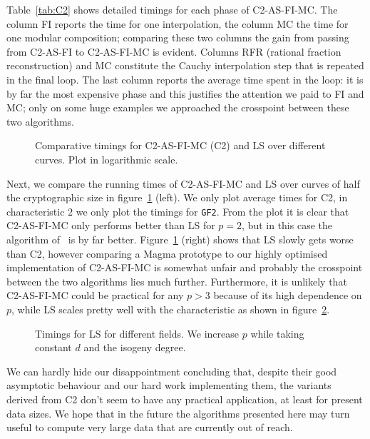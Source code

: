Table~\ref{tab:C2} shows detailed timings for each phase of
C2-AS-FI-MC. The column FI reports the time for one interpolation, the
column MC the time for one modular composition; comparing these two
columns the gain from passing from C2-AS-FI to C2-AS-FI-MC is
evident. Columns RFR (rational fraction reconstruction) and MC
constitute the Cauchy interpolation step that is repeated in the final
loop. The last column reports the average time spent in the loop: it
is by far the most expensive phase and this justifies the attention we
paid to FI and MC; only on some huge examples we approached the
crosspoint between these two algorithms.

\begin{figure}
  \centering
   \caption{Comparative timings for C2-AS-FI-MC (C2) and LS over
     different curves. Plot in logarithmic scale.}
  \label{fig:comp}
\end{figure}

Next, we compare the running times of C2-AS-FI-MC and LS over curves
of half the cryptographic size in figure~\ref{fig:comp} (left). We
only plot average times for C2, in characteristic $2$ we only plot the
timings for \texttt{GF2}. From the plot it is clear that C2-AS-FI-MC
only performs better than LS for $p=2$, but in this case the algorithm
of~\cite{Ler96} is by far better.  Figure~\ref{fig:comp} (right) shows
that LS slowly gets worse than C2, however comparing a Magma prototype
to our highly optimised implementation of C2-AS-FI-MC is somewhat
unfair and probably the crosspoint between the two algorithms lies
much further. Furthermore, it is unlikely that C2-AS-FI-MC could be
practical for any $p>3$ because of its high dependence on $p$, while
LS scales pretty well with the characteristic as shown in
figure~\ref{fig:LSp}.

\begin{figure}
  \centering
  \caption{Timings for LS for different fields. We increase
    $p$ while taking constant $d$ and the isogeny degree.}
  \label{fig:LSp}
\end{figure}

We can hardly hide our disappointment concluding that, despite their
good asymptotic behaviour and our hard work implementing them, the
variants derived from C2 don't seem to have any practical application,
at least for present data sizes. We hope that in the future the
algorithms presented here may turn useful to compute very large data
that are currently out of reach.




%
